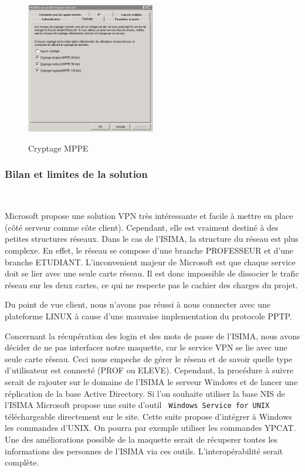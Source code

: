\begin{figure}[H]
	\begin{center}
		\includegraphics[width=0.50\textwidth]{partie_2/screen_windows/cryptage.PNG}\\
	\end{center}
	\caption{Cryptage MPPE}
	\label{VPN_CRYPTAGE}
\end{figure}


\subsubsection{Bilan et limites de la solution}
~

Microsoft propose une solution VPN très intéressante et facile à mettre en place (côté serveur comme côte client). Cependant, elle est vraiment destiné à des petites structures réseaux. Dans le cas de l'ISIMA, la structure du réseau est plus complexe. En effet, le réseau se compose d'une branche PROFESSEUR et d'une branche ETUDIANT. L'inconvenient majeur de Microsoft est que chaque service doit se lier avec une seule carte réseau. Il est donc impossible de dissocier le trafic réseau sur les deux cartes, ce qui ne respecte pas le cachier des charges du projet.

Du point de vue client, nous n'avons pas réussi à nous connecter avec une plateforme LINUX à cause d'une mauvaise implementation du protocole PPTP.


Concernant la récupération des login et des mots de passe de l'ISIMA, nous avons décider de ne pas interfacer notre maquette, car le service VPN se lie avec une seule carte réseau. Ceci nous empeche de gérer le réseau et de savoir quelle type d'utilisateur est connecté (PROF ou ELEVE). Cependant, la procédure à suivre serait de rajouter sur le domaine de l'ISIMA le serveur Windows et de lancer une réplication de la base Active Directory. 
Si l'on souhaite utiliser la base NIS de l'ISIMA Microsoft propose une suite d'outil \verb| Windows Service for UNIX| téléchargeable directement sur le site. Cette suite propose d'intégrer à Windows les commandes d'UNIX. On pourra par exemple utiliser les commandes YPCAT. Une des améliorations possible de la maquette serait de récuperer toutes les informations des personnes de l'ISIMA via ces outils. L'interopérabilité serait complète.

